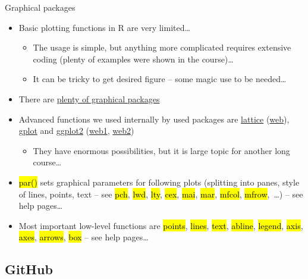 \documentclass[compress, ucs, xelatex, 11pt, xcolor=svgnames,
  hyperref={
    bookmarks=true,
    unicode=true,
    colorlinks=true,
    pdftitle={Molecular data in R},
    plainpages=false,
    pdfauthor={Vojtech Zeisek},
    pdfsubject={Course about phylogeny and evolution in R},
    pdfcreator={XeLaTeX},
    pdfkeywords={R, evolution, phylogeny, molecular data},
    linkcolor=Tomato,
    anchorcolor=SaddleBrown,
    citecolor=Goldenrod,
    filecolor=DarkMagenta,
    menucolor=Sienna,
    urlcolor=DarkTurquoise,
    pdftex},
  url={hyphens, lowtilde} %
  ]{beamer}
\renewcommand{\texttt}[1]{\hl{\ttfamily #1}}
\begin{document}
\begin{frame}{Graphical packages}
  \begin{itemize}
    \item Basic plotting functions in R are very limited\ldots
    \begin{itemize}
      \item The usage is simple, but anything more complicated requires extensive coding (plenty of examples were shown in the course)\ldots
      \item It can be tricky to get desired figure -- some magic use to be needed\ldots
    \end{itemize}
    \item There are \href{https://cran.r-project.org/web/views/Graphics.html}{plenty of graphical packages}
    \item Advanced functions we used internally by used packages are \href{https://cran.r-project.org/web/packages/lattice/index.html}{lattice} (\href{http://lattice.r-forge.r-project.org/}{web}), \href{https://cran.r-project.org/web/packages/gplots/index.html}{gplot} and \href{https://cran.r-project.org/web/packages/ggplot2/index.html}{ggplot2} (\href{http://ggplot2.org/}{web1}, \href{http://ggplot2.tidyverse.org/}{web2})
    \begin{itemize}
      \item They have enormous possibilities, but it is large topic for another long course\ldots
    \end{itemize}
    \item \texttt{par()} sets graphical parameters for following plots (splitting into panes, style of lines, points, text -- see \texttt{pch}, \texttt{lwd}, \texttt{lty}, \texttt{cex}, \texttt{mai}, \texttt{mar}, \texttt{mfcol}, \texttt{mfrow},~\ldots) -- see help pages\ldots
    \item Most important low-level functions are \texttt{points}, \texttt{lines}, \texttt{text}, \texttt{abline}, \texttt{legend}, \texttt{axis}, \texttt{axes}, \texttt{arrows}, \texttt{box} -- see help pages\ldots
  \end{itemize}
\end{frame}

\subsection{GitHub}
\end{document}

